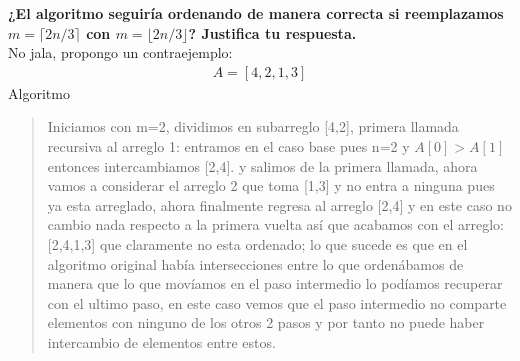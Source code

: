 \textbf{¿El algoritmo seguiría ordenando de manera correcta si reemplazamos $m=\lceil 2n /3 \rceil$ con $m=\lfloor 2n /3 \rfloor$? Justifica tu respuesta.}\\

No jala, propongo un contraejemplo:
\begin{align*}
    A = [4,2,1,3]
\end{align*}
\textcolor{bibi}{Algoritmo}
\begin{quote}
    Iniciamos con m=2, dividimos en subarreglo [4,2], primera llamada recursiva al arreglo 1: entramos en el caso base pues n=2 y $A[0]>A[1]$ entonces intercambiamos [2,4]. y salimos de la primera llamada, ahora vamos a considerar el arreglo 2 que toma [1,3] y no entra a ninguna pues ya esta arreglado, ahora finalmente regresa al arreglo [2,4] y en este caso no cambio nada respecto a la primera vuelta así que acabamos con el arreglo: [2,4,1,3] que claramente no esta ordenado; lo que sucede es que en el algoritmo original había intersecciones entre lo que ordenábamos de manera que lo que movíamos en el paso intermedio lo podíamos recuperar con el ultimo paso, en este caso vemos que el paso intermedio no comparte elementos con ninguno de los otros 2 pasos y por tanto no puede haber intercambio de elementos entre estos.\\
\end{quote}
